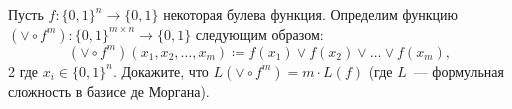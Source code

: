 Пусть $f: \{0, 1\}^n \to \{0, 1\}$ некоторая булева функция. Определим функцию $\left( \vee \circ f^m
\right): \{0, 1\}^{m \times n} \to \{0, 1\}$ следующим образом:
$$\left( \vee \circ f^m \right)(x_1, x_2, \dots, x_m) \coloneqq f(x_1) \lor f(x_2) \lor \dots \lor f(x_m),$$2
где $x_i \in \{0, 1\}^n$. Докажите, что $L\left( \vee \circ f^m \right) = m \cdot L(f)$ (где $L$~---
формульная сложность в базисе де Моргана).
    